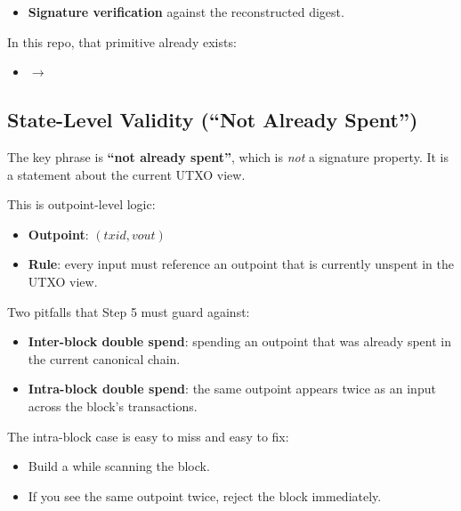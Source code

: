 \begin{itemize}
  \item \textbf{Signature verification} against the reconstructed digest.
\end{itemize}

In this repo, that primitive already exists:

\begin{itemize}
  \item {} $\to$ 
\end{itemize}

\subsection{State-Level Validity (``Not Already Spent'')}
\label{sec:ch10-not-already-spent}

The key phrase is \textbf{``not already spent''}, which is \emph{not} a signature property. It is a statement about the current UTXO view.

This is outpoint-level logic:

\begin{itemize}
  \item \textbf{Outpoint}: $(txid, vout)$
  \item \textbf{Rule}: every input must reference an outpoint that is currently unspent in the UTXO view.
\end{itemize}

Two pitfalls that Step 5 must guard against:

\begin{itemize}
  \item \textbf{Inter-block double spend}: spending an outpoint that was already spent in the current canonical chain.
  \item \textbf{Intra-block double spend}: the same outpoint appears twice as an input across the block's transactions.
\end{itemize}

The intra-block case is easy to miss and easy to fix:

\begin{itemize}
  \item Build a  while scanning the block.
  \item If you see the same outpoint twice, reject the block immediately.
\end{itemize}

